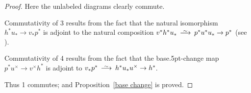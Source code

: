 \documentclass{compositio}
\theoremstyle{plain}
\theoremstyle{definition}
\theoremstyle{remark}
\numberwithin{equation}{thm}
\begin{document}
\begin{proof}
Here the unlabeled diagrams clearly commute.

Commutativity of {\textcircled{\scriptsize{3}}} results from the fact that the natural isomorphism $h^*u_*\to v_*p^*$ is adjoint to
the natural composition \mbox{$v^*h^*u_*{{\mkern8mu\longrightarrow \mkern-25.5mu{}^\sim\mkern17mu}} p^*u^*u_*\to p^*$} (see \cite[3.7.2(c)]{li}).

Commutativity of {\textcircled{\scriptsize{4}}} results from the fact that the base{\kern.5pt}-change map 
$p^*u^\times\to v^\times h^*$ is adjoint to  $v_*p^*{{\mkern8mu\longrightarrow \mkern-25.5mu{}^\sim\mkern17mu}} h^*u_*u^\times\to h^*{\mkern-1mu}$.

Thus {\textcircled{\scriptsize{1}}} commutes; and Proposition~\ref{base change} is proved. 
\end{proof}
\end{document}
